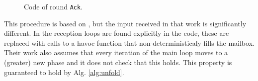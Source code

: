 \begin{figure}
\renewcommand{\ttdefault}{pcr}

\caption{Code of round \texttt{Ack}.}
\label{roundcode}
\end{figure}

This procedure is based on \cite{damian_communication-closed_2019}, but the input received in that work is significantly different. In \cite{damian_communication-closed_2019} the reception loops are found explicitly in the code, these are replaced with calls to a havoc function that non-deterministicaly fills the mailbox. Their work also assumes that every iteration of the main loop moves to a (greater) new phase and it does not check that this holds. This property is guaranteed to hold by Alg. \ref{alg:unfold}.